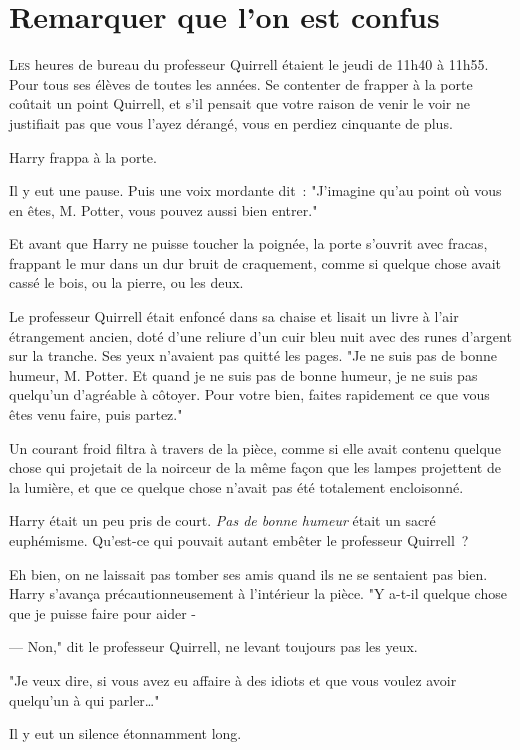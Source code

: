 \chapter{Remarquer que l'on est confus}

\lettrine{L}{es} heures de bureau du professeur Quirrell étaient le jeudi de 11h40 à 11h55. Pour tous ses élèves de toutes les années. Se contenter de frapper à la porte coûtait un point Quirrell, et s'il pensait que votre raison de venir le voir ne justifiait pas que vous l'ayez dérangé, vous en perdiez cinquante de plus.

Harry frappa à la porte.

Il y eut une pause. Puis une voix mordante dit~: "J'imagine qu'au point où vous en êtes, M. Potter, vous pouvez aussi bien entrer."

Et avant que Harry ne puisse toucher la poignée, la porte s'ouvrit avec fracas, frappant le mur dans un dur bruit de craquement, comme si quelque chose avait cassé le bois, ou la pierre, ou les deux.

Le professeur Quirrell était enfoncé dans sa chaise et lisait un livre à l'air étrangement ancien, doté d'une reliure d'un cuir bleu nuit avec des runes d'argent sur la tranche. Ses yeux n'avaient pas quitté les pages. "Je ne suis pas de bonne humeur, M. Potter. Et quand je ne suis pas de bonne humeur, je ne suis pas quelqu'un d'agréable à côtoyer. Pour votre bien, faites rapidement ce que vous êtes venu faire, puis partez."

Un courant froid filtra à travers de la pièce, comme si elle avait contenu quelque chose qui projetait de la noirceur de la même façon que les lampes projettent de la lumière, et que ce quelque chose n'avait pas été totalement encloisonné.

Harry était un peu pris de court. \emph{Pas de bonne humeur} était un sacré euphémisme. Qu'est-ce qui pouvait autant embêter le professeur Quirrell~?

Eh bien, on ne laissait pas tomber ses amis quand ils ne se sentaient pas bien. Harry s'avança précautionneusement à l'intérieur la pièce. "Y a-t-il quelque chose que je puisse faire pour aider -

--- Non," dit le professeur Quirrell, ne levant toujours pas les yeux.

"Je veux dire, si vous avez eu affaire à des idiots et que vous voulez avoir quelqu'un à qui parler…"

Il y eut un silence étonnamment long.

